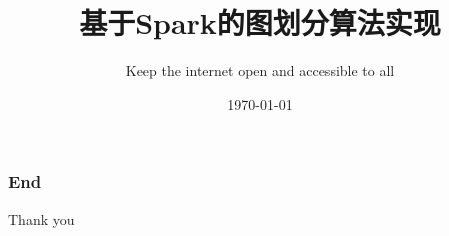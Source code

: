 \documentclass[UTF8]{ctexbeamer}
\begin{document}
\title{基于Spark的图划分算法实现}
\subtitle{Keep the internet open and accessible to all}


\date{\today}

\frame{\titlepage}


\begin{frame}
    \frametitle{End}
    \centering
    \Huge{Thank you}
\end{frame}
\end{document}
